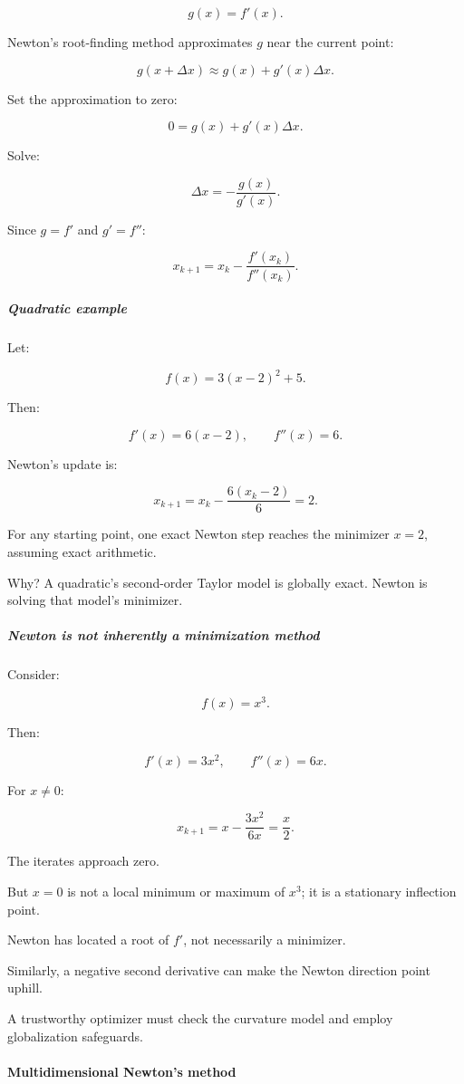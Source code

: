 \[
g(x)=f'(x).
\]

Newton's root-finding method approximates \(g\) near the current point:

\[
g(x+\Delta x) \approx g(x)+g'(x)\Delta x.
\]

Set the approximation to zero:

\[
0=g(x)+g'(x)\Delta x.
\]

Solve:

\[
\Delta x=-\frac{g(x)}{g'(x)}.
\]

Since \(g=f'\) and \(g'=f''\):

\[
\boxed{ x_{k+1} = x_k-\frac{f'(x_k)}{f''(x_k)} }.
\]

\subparagraph{Quadratic example}\label{quadratic-example}

Let:

\[
f(x)=3(x-2)^2+5.
\]

Then:

\[
f'(x)=6(x-2), \qquad f''(x)=6.
\]

Newton's update is:

\[
x_{k+1} = x_k-\frac{6(x_k-2)}6 =2.
\]

For any starting point, one exact Newton step reaches the minimizer \(x=2\), assuming exact arithmetic.

Why? A quadratic's second-order Taylor model is globally exact. Newton is solving that model's minimizer.

\subparagraph{Newton is not inherently a minimization method}\label{newton-is-not-inherently-a-minimization-method}

Consider:

\[
f(x)=x^3.
\]

Then:

\[
f'(x)=3x^2,\qquad f''(x)=6x.
\]

For \(x\ne0\):

\[
x_{k+1} = x-\frac{3x^2}{6x} =\frac x2.
\]

The iterates approach zero.

But \(x=0\) is not a local minimum or maximum of \(x^3\); it is a stationary inflection point.

Newton has located a root of \(f'\), not necessarily a minimizer.

Similarly, a negative second derivative can make the Newton direction point uphill.

A trustworthy optimizer must check the curvature model and employ globalization safeguards.

\paragraph{Multidimensional Newton's method}\label{multidimensional-newtons-method}

